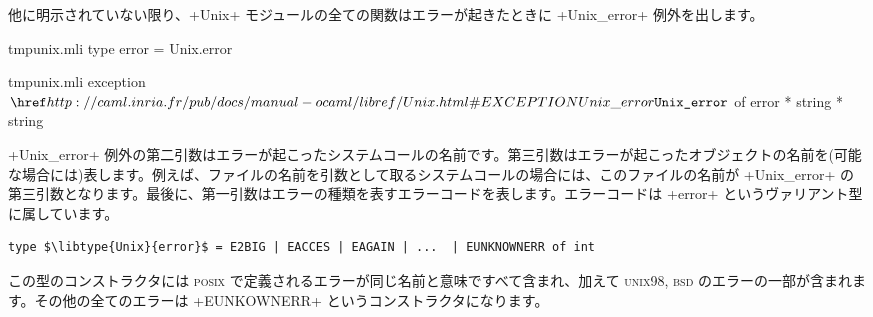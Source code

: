他に明示されていない限り、\ml+Unix+ モジュールの全ての関数はエラーが起きたときに \ml+Unix_error+ 例外を出します。
%
\begin{codefile}{tmpunix.mli}
type error = Unix.error
\end{codefile}
%
\begin{listingcodefile}{tmpunix.mli}
exception $\libexn{Unix}{Unix\_error}$ of error * string * string
\end{listingcodefile}
%
\ml+Unix_error+ 例外の第二引数はエラーが起こったシステムコールの名前です。第三引数はエラーが起こったオブジェクトの名前を(可能な場合には)表します。例えば、ファイルの名前を引数として取るシステムコールの場合には、このファイルの名前が \ml+Unix_error+ の第三引数となります。最後に、第一引数はエラーの種類を表すエラーコードを表します。エラーコードは \ml+error+ というヴァリアント型に属しています。
%
\begin{lstlisting}
type $\libtype{Unix}{error}$ = E2BIG | EACCES | EAGAIN | ...  | EUNKNOWNERR of int
\end{lstlisting}
%
この型のコンストラクタには \textsc{posix} で定義されるエラーが同じ名前と意味ですべて含まれ、加えて \textsc{unix98}, \textsc{bsd} のエラーの一部が含まれます。その他の全てのエラーは \ml+EUNKOWNERR+ というコンストラクタになります。

